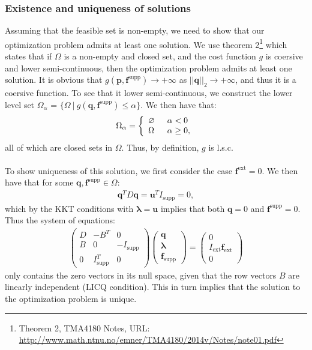\documentclass[10pt,a4paper]{article}
\begin{document}
\subsubsection{Existence and uniqueness of solutions}
Assuming that the feasible set is non-empty, we need to show that our optimization problem admits at least one solution. We use theorem 2\footnote{Theorem 2, TMA4180 Notes, URL: \url{http://www.math.ntnu.no/emner/TMA4180/2014v/Notes/note01.pdf}} which states that if $\Omega$ is a non-empty and closed set, and the cost function $g$ is coersive and lower semi-continuous, then the optimization problem admits at least one solution. It is obvious that $g(\boldsymbol{p},\boldsymbol{f}^\text{supp}) \rightarrow +\infty$ as $||\boldsymbol{q}||_2 \rightarrow +\infty$, and thus it is a coersive function. To see that it lower semi-continuous, we construct the lower level set $\Omega_\alpha$ = $\{\Omega \ | \ g(\boldsymbol{q},\boldsymbol{f}^\text{supp}) \leq \alpha \}$. We then have that:
\begin{align}
\Omega_\alpha = \left\lbrace 
\begin{array}{l l l}
\varnothing & \enspace \alpha < 0\\
\Omega & \enspace \alpha \geq 0,
\end{array}\right.
\end{align}
all of which are closed sets in $\Omega$. Thus, by definition, $g$ is l.s.c.
\\\\
To show uniqueness of this solution, we first consider the case $\boldsymbol{f}^{\text{ext}} = 0$. We then have that for some $\boldsymbol{q},\boldsymbol{f}^{\text{supp}}\in\Omega$:
\begin{align*}
\boldsymbol{q}^T D \boldsymbol{q} = \boldsymbol{u}^T I_{\text{supp}} = 0,
\end{align*}
which by the KKT conditions with $\boldsymbol{\lambda} = \boldsymbol{u}$ implies that both $\boldsymbol{q} = 0$ and $\boldsymbol{f}^{\text{supp}}=0$. Thus the system of equations:
\begin{align}
\begin{pmatrix}
D & -B^T & 0\\
B & 0 & -I_\text{supp}\\
0 & I_\text{supp}^T & 0 
\end{pmatrix}
\begin{pmatrix}
\boldsymbol{q}\\
\boldsymbol{\lambda}\\
\boldsymbol{f}_\text{supp}
\end{pmatrix}
=
\begin{pmatrix}
0\\
I_\text{ext}\boldsymbol{f}_\text{ext}\\
0
\end{pmatrix}
\end{align}
only contains the zero vectors in its null space, given that the row vectors $B$ are linearly independent (LICQ condition). This in turn implies that the solution to the optimization problem is unique.
\end{document}
